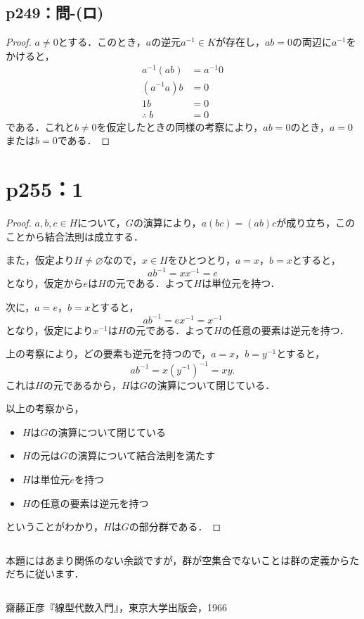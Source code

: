 \documentclass[a4paper,10pt,fleqn]{ltjsarticle}
\begin{document}
\subsection*{p249：問-(ロ)}
\begin{tleftbar}
  \begin{proof}
    $a \ne 0$とする．このとき，$a$の逆元$a^{-1} \in K$が存在し，$ab=0$の両辺に$a^{-1}$をかけると，
    \begin{align*}
      a^{-1} (ab)   & = a^{-1} 0 \\
      (a^{-1}a)b    & =0         \\
      1b            & =0         \\
      \therefore~ b & =0
    \end{align*}
    である．これと$b \ne 0$を仮定したときの同様の考察により，$ab=0$のとき，$a=0$または$b=0$である．
  \end{proof}
\end{tleftbar}

\newpage

\section*{p255：1}
\begin{tleftbar}
  \begin{proof}
    $a,b,c \in H$について，$G$の演算により，$a(bc)=(ab)c$が成り立ち，このことから結合法則は成立する．

    また，仮定より$H \ne \varnothing $なので，$x \in H$をひとつとり，$a=x$，$b=x$とすると，
    \[
      ab^{-1} = x x^{-1}=e
    \]
    となり，仮定から$e$は$H$の元である．よって$H$は単位元を持つ．

    次に，$ a=e$，$b=x$とすると，
    \[
      ab^{-1}=ex^{-1}=x^{-1}
    \]
    となり，仮定により$x^{-1}$は$H$の元である．よって$H$の任意の要素は逆元を持つ．

    上の考察により，どの要素も逆元を持つので，$a=x$，$b=y^{-1}$とすると，
    \[
      ab^{-1}=x(y^{-1})^{-1} = xy.
    \]
    これは$H$の元であるから，$H$は$G$の演算について閉じている．

    以上の考察から，
    \begin{itemize}
      \item $H$は$G$の演算について閉じている
      \item $H$の元は$G$の演算について結合法則を満たす
      \item $H$は単位元$e$を持つ
      \item $H$の任意の要素は逆元を持つ
    \end{itemize}
    ということがわかり，$H$は$G$の部分群である．
  \end{proof}
\end{tleftbar}

\begin{column}
  本題にはあまり関係のない余談ですが，群が空集合でないことは群の定義からただちに従います．
\end{column}

\newpage
\begin{thebibliography}{9}
   齋藤正彦『線型代数入門』，東京大学出版会，1966
\end{thebibliography}
\end{document}
